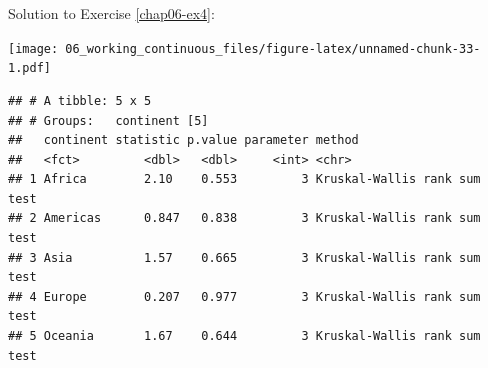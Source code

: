 \documentclass[
  12pt,
  krantz2]{krantz}
\makeatletter
\newenvironment{Shaded}{\begin{snugshade}}{\end{snugshade}}
\newcommand{\CommentTok}[1]{\textcolor[rgb]{0.56,0.35,0.01}{\textit{#1}}}
\newcommand{\DataTypeTok}[1]{\textcolor[rgb]{0.13,0.29,0.53}{#1}}
\newcommand{\DecValTok}[1]{\textcolor[rgb]{0.00,0.00,0.81}{#1}}
\newcommand{\KeywordTok}[1]{\textcolor[rgb]{0.13,0.29,0.53}{\textbf{#1}}}
\newcommand{\NormalTok}[1]{#1}
\newcommand{\OperatorTok}[1]{\textcolor[rgb]{0.81,0.36,0.00}{\textbf{#1}}}
\newcommand{\StringTok}[1]{\textcolor[rgb]{0.31,0.60,0.02}{#1}}
\newenvironment{kframe}{%
\medskip{}
\setlength{\fboxsep}{.8em}
 \def\at@end@of@kframe{}%
 \ifinner\ifhmode%
  \def\at@end@of@kframe{\end{minipage}}%
  \begin{minipage}{\columnwidth}%
 \fi\fi%
 \def\FrameCommand##1{\hskip\@totalleftmargin \hskip-\fboxsep
 \colorbox{shadecolor}{##1}\hskip-\fboxsep
     \hskip-\linewidth \hskip-\@totalleftmargin \hskip\columnwidth}%
 \MakeFramed {\advance\hsize-\width
   \@totalleftmargin\z@ \linewidth\hsize
   \@setminipage}}%
 {\par\unskip\endMakeFramed%
 \at@end@of@kframe}
\renewenvironment{Shaded}{\begin{kframe}}{\end{kframe}}
\makeatother
\begin{document}
Solution to Exercise \ref{chap06-ex4}:

\begin{Shaded}
\end{Shaded}

\texttt{[image: 06\_working\_continuous\_files/figure-latex/unnamed-chunk-33-1.pdf]}

\begin{Shaded}
\end{Shaded}

\begin{verbatim}
## # A tibble: 5 x 5
## # Groups:   continent [5]
##   continent statistic p.value parameter method                      
##   <fct>         <dbl>   <dbl>     <int> <chr>                       
## 1 Africa        2.10    0.553         3 Kruskal-Wallis rank sum test
## 2 Americas      0.847   0.838         3 Kruskal-Wallis rank sum test
## 3 Asia          1.57    0.665         3 Kruskal-Wallis rank sum test
## 4 Europe        0.207   0.977         3 Kruskal-Wallis rank sum test
## 5 Oceania       1.67    0.644         3 Kruskal-Wallis rank sum test
\end{verbatim}
\end{document}
